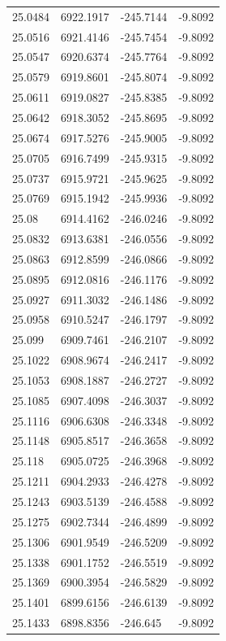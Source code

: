 \begin{table}[H]
\begin{tabular}{llll}
25.0484 & 6922.1917 & -245.7144 & -9.8092 \\
25.0516 & 6921.4146 & -245.7454 & -9.8092 \\
25.0547 & 6920.6374 & -245.7764 & -9.8092 \\
25.0579 & 6919.8601 & -245.8074 & -9.8092 \\
25.0611 & 6919.0827 & -245.8385 & -9.8092 \\
25.0642 & 6918.3052 & -245.8695 & -9.8092 \\
25.0674 & 6917.5276 & -245.9005 & -9.8092 \\
25.0705 & 6916.7499 & -245.9315 & -9.8092 \\
25.0737 & 6915.9721 & -245.9625 & -9.8092 \\
25.0769 & 6915.1942 & -245.9936 & -9.8092 \\
25.08 & 6914.4162 & -246.0246 & -9.8092 \\
25.0832 & 6913.6381 & -246.0556 & -9.8092 \\
25.0863 & 6912.8599 & -246.0866 & -9.8092 \\
25.0895 & 6912.0816 & -246.1176 & -9.8092 \\
25.0927 & 6911.3032 & -246.1486 & -9.8092 \\
25.0958 & 6910.5247 & -246.1797 & -9.8092 \\
25.099 & 6909.7461 & -246.2107 & -9.8092 \\
25.1022 & 6908.9674 & -246.2417 & -9.8092 \\
25.1053 & 6908.1887 & -246.2727 & -9.8092 \\
25.1085 & 6907.4098 & -246.3037 & -9.8092 \\
25.1116 & 6906.6308 & -246.3348 & -9.8092 \\
25.1148 & 6905.8517 & -246.3658 & -9.8092 \\
25.118 & 6905.0725 & -246.3968 & -9.8092 \\
25.1211 & 6904.2933 & -246.4278 & -9.8092 \\
25.1243 & 6903.5139 & -246.4588 & -9.8092 \\
25.1275 & 6902.7344 & -246.4899 & -9.8092 \\
25.1306 & 6901.9549 & -246.5209 & -9.8092 \\
25.1338 & 6901.1752 & -246.5519 & -9.8092 \\
25.1369 & 6900.3954 & -246.5829 & -9.8092 \\
25.1401 & 6899.6156 & -246.6139 & -9.8092 \\
25.1433 & 6898.8356 & -246.645 & -9.8092 \\

\end{tabular}
\end{table}
